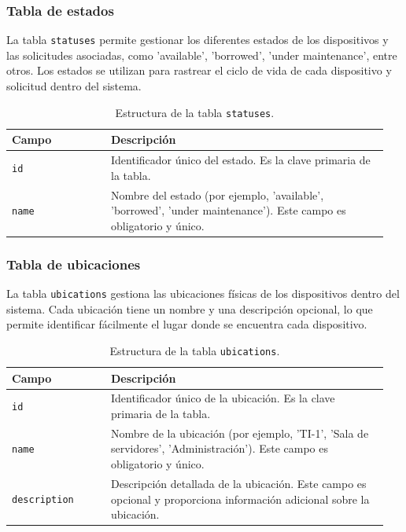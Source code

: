\subsubsection*{Tabla de estados}\label{sec:statuses}

La tabla \texttt{statuses} permite gestionar los diferentes estados de los dispositivos y las solicitudes asociadas, como 'available', 'borrowed', 'under maintenance', entre otros. Los estados se utilizan para rastrear el ciclo de vida de cada dispositivo y solicitud dentro del sistema.

\begin{table}[H]
	\centering
	\begin{tabular}{|p{0.25\linewidth}|p{0.7\linewidth}|}
		\hline
		\textbf{Campo} & \textbf{Descripción} \\
		\hline
		\texttt{id} & Identificador único del estado. Es la clave primaria de la tabla. \\
		\hline
		\texttt{name} & Nombre del estado (por ejemplo, 'available', 'borrowed', 'under maintenance'). Este campo es obligatorio y único. \\
		\hline
	\end{tabular}
	\caption{Estructura de la tabla \texttt{statuses}.}
	\label{tab:tabla_statuses}
\end{table}

\subsubsection*{Tabla de ubicaciones}

La tabla \texttt{ubications} gestiona las ubicaciones físicas de los dispositivos dentro del sistema. Cada ubicación tiene un nombre y una descripción opcional, lo que permite identificar fácilmente el lugar donde se encuentra cada dispositivo.

\begin{table}[H]
	\centering
	\begin{tabular}{|p{0.25\linewidth}|p{0.7\linewidth}|}
		\hline
		\textbf{Campo} & \textbf{Descripción} \\
		\hline
		\texttt{id} & Identificador único de la ubicación. Es la clave primaria de la tabla. \\
		\hline
		\texttt{name} & Nombre de la ubicación (por ejemplo, 'TI-1', 'Sala de servidores', 'Administración'). Este campo es obligatorio y único. \\
		\hline
		\texttt{description} & Descripción detallada de la ubicación. Este campo es opcional y proporciona información adicional sobre la ubicación. \\
		\hline
	\end{tabular}
	\caption{Estructura de la tabla \texttt{ubications}.}
	\label{tab:tabla_ubications}
\end{table}


